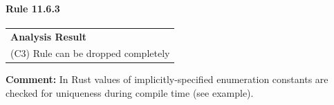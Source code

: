 \paragraph{Rule 11.6.3}
\begin{longtable}{p{13cm}}
\textbf{Analysis Result} \\
(C3) Rule can be dropped completely \\
\end{longtable}
\textbf{Comment:} In Rust values of implicitly-specified enumeration constants are checked for uniqueness during compile time (see example). \\


